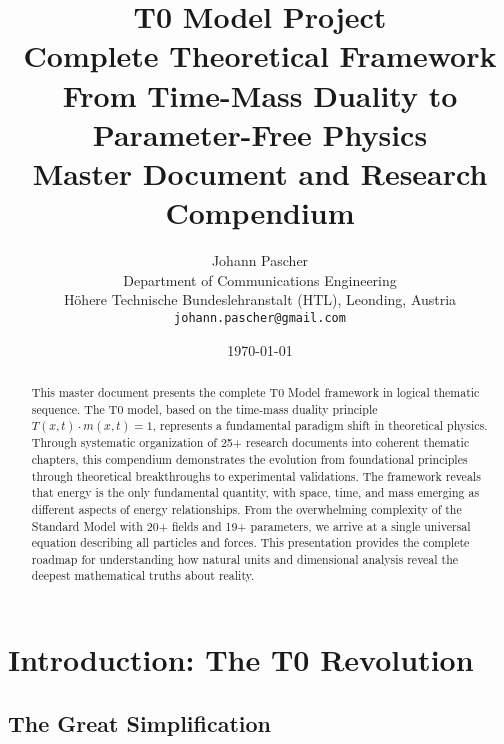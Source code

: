 \documentclass[12pt,a4paper]{report}
\begin{document}
	
	\title{{\Huge T0 Model Project}\\
		{\LARGE Complete Theoretical Framework}\\
		{\Large From Time-Mass Duality to Parameter-Free Physics}\\
		\vspace{1cm}
		{\large Master Document and Research Compendium}}
	
	\author{{\Large Johann Pascher}\\
		Department of Communications Engineering\\
		Höhere Technische Bundeslehranstalt (HTL), Leonding, Austria\\
		\texttt{johann.pascher@gmail.com}}
	
	\date{\today}
	
	\maketitle
	
	\begin{abstract}
		This master document presents the complete T0 Model framework in logical thematic sequence. The T0 model, based on the time-mass duality principle $T(x,t) \cdot m(x,t) = 1$, represents a fundamental paradigm shift in theoretical physics. Through systematic organization of 25+ research documents into coherent thematic chapters, this compendium demonstrates the evolution from foundational principles through theoretical breakthroughs to experimental validations. The framework reveals that energy is the only fundamental quantity, with space, time, and mass emerging as different aspects of energy relationships. From the overwhelming complexity of the Standard Model with 20+ fields and 19+ parameters, we arrive at a single universal equation describing all particles and forces. This presentation provides the complete roadmap for understanding how natural units and dimensional analysis reveal the deepest mathematical truths about reality.
	\end{abstract}
	
	\tableofcontents
	\listoftables
	
	\chapter{Introduction: The T0 Revolution}
	
	\section{The Great Simplification}
	
\end{document}
